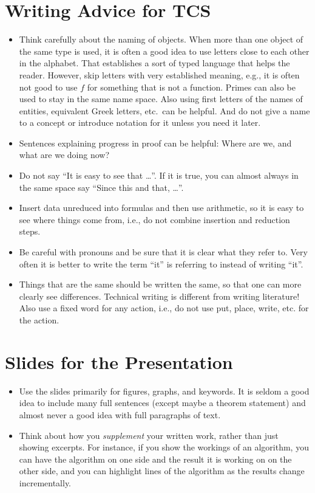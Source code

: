 \documentclass[a4paper,12pt]{report}
\begin{document}
\section*{Writing Advice for TCS}
\begin{itemize}
\item
Think carefully about the naming of objects. When more than one object
of the same type is used, it is often a good idea to use letters close
to each other in the alphabet. That establishes a sort of typed language
that helps the reader.
However, skip letters with very established meaning, e.g., it is
often not good to use $f$ for something that is not a function.
Primes can also be used to stay in the same name space.
Also using first letters of the names of entities, equivalent Greek
letters, etc.\ can be helpful.
And do not give a name to a concept or introduce notation for it
unless you need it later.
\item
Sentences explaining progress in proof can be helpful: Where are we, and what
are we doing now?
\item
Do not say ``It is easy to see that \ldots''. If it is true, you
can almost always in the same space say ``Since this and that, \ldots''.
\item
Insert data unreduced into formulas and then use arithmetic,
so it is easy to see where things come from, i.e., do not combine
insertion and reduction steps.
\item
  Be careful with pronouns and be sure that it is clear what they refer to.
  Very often it is better to write the term ``it'' is referring to instead of writing ``it''.
\item
  Things that are the same should be written the same, so that one can more clearly see differences. Technical writing is different from writing literature! Also use a fixed word for any action, i.e., do not use put, place, write, etc. for
  the action.
\end{itemize}

\section*{Slides for the Presentation}
\begin{itemize}
\item
  Use the slides primarily for figures, graphs, and keywords. It is seldom a
  good idea to include many full sentences
  (except maybe a theorem statement) and
  almost never a good idea with full paragraphs of text.
\item
  Think about how you \emph{supplement} your written work,
  rather than just showing excerpts.
  For instance, if you show the workings of an algorithm, you can have the
  algorithm on one side and the result it is working on on the other side,
  and you can highlight lines of the algorithm as the results change
  incrementally.
\end{itemize}
\end{document}
